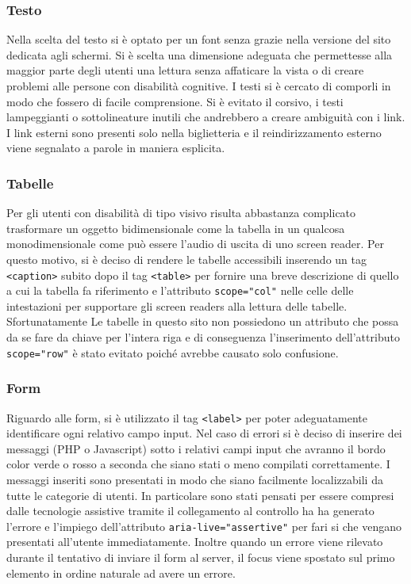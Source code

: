     \subsubsection{Testo}
    Nella scelta del testo si è optato per un font senza grazie nella versione del sito dedicata agli schermi. Si è scelta una dimensione adeguata che permettesse alla maggior parte degli utenti una lettura senza affaticare la vista o di creare problemi alle persone con disabilità cognitive. I testi si è cercato di comporli in modo che fossero di facile comprensione. Si è evitato il corsivo, i testi lampeggianti o sottolineature inutili che andrebbero a creare ambiguità con i link.\\
    I link esterni sono presenti solo nella biglietteria e il reindirizzamento esterno viene segnalato a parole in maniera esplicita.
    \subsubsection{Tabelle}
    Per gli utenti con disabilità di tipo visivo risulta abbastanza complicato trasformare un oggetto bidimensionale come la tabella in un qualcosa monodimensionale come può essere l’audio di uscita di uno screen reader. Per questo motivo, si è deciso di rendere le tabelle accessibili inserendo un tag \texttt{<caption>} subito dopo il tag \texttt{<table>} per fornire una breve descrizione di quello a cui la tabella fa riferimento e l'attributo \texttt{scope="col"} nelle celle delle intestazioni per supportare gli screen readers alla lettura delle tabelle. Sfortunatamente Le tabelle in questo sito non possiedono un attributo che possa da se fare da chiave per l'intera riga e di conseguenza l'inserimento dell'attributo \texttt{scope="row"} è stato evitato poiché avrebbe causato solo confusione.
    \subsubsection{Form}
    Riguardo alle form, si è utilizzato il tag \texttt{<label>} per poter adeguatamente identificare ogni relativo campo input. Nel caso di errori si è deciso di inserire dei messaggi (PHP o Javascript) sotto i relativi campi input che avranno il bordo color verde o rosso a seconda che siano stati o meno compilati correttamente. I messaggi inseriti sono presentati in modo che siano facilmente localizzabili da tutte le categorie di utenti. In particolare sono stati pensati per essere compresi dalle tecnologie assistive tramite il collegamento al controllo ha ha generato l'errore e l'impiego dell'attributo \texttt{aria-live="assertive"} per fari si che vengano presentati all'utente immediatamente. Inoltre quando un errore viene rilevato durante il tentativo di inviare il form al server, il focus viene spostato sul primo elemento in ordine naturale ad avere un errore.

